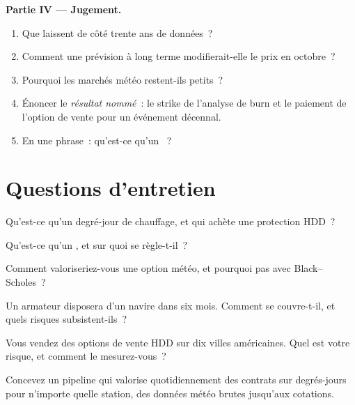 \begin{problem}
\medskip\noindent\textbf{Partie IV --- Jugement.}
\begin{enumerate}[resume]
\item Que laissent de côté trente ans de données~?
\item Comment une prévision à long terme modifierait-elle le prix en octobre~?
\item Pourquoi les marchés météo restent-ils petits~?
\item Énoncer le \emph{résultat nommé}~: le strike de l'analyse de burn et le paiement de l'option de vente pour un événement décennal.
\item En une phrase~: qu'est-ce qu'un ~?
\end{enumerate}
\end{problem}

\section{Questions d'entretien}

\begin{interviewq}\label{iq:m3:freight-weather-and-other-corners:1}
Qu'est-ce qu'un degré-jour de chauffage, et qui achète une protection HDD~?
\end{interviewq}

\begin{interviewq}\label{iq:m3:freight-weather-and-other-corners:2}
Qu'est-ce qu'un , et sur quoi se règle-t-il~?
\end{interviewq}

\begin{interviewq}\label{iq:m3:freight-weather-and-other-corners:3}
Comment valoriseriez-vous une option météo, et pourquoi pas avec Black--Scholes~?
\end{interviewq}

\begin{interviewq}\label{iq:m3:freight-weather-and-other-corners:4}
Un armateur disposera d'un navire dans six mois. Comment se couvre-t-il, et quels risques subsistent-ils~?
\end{interviewq}

\begin{interviewq}\label{iq:m3:freight-weather-and-other-corners:5}
Vous vendez des options de vente HDD sur dix villes américaines. Quel est votre risque, et comment le mesurez-vous~?
\end{interviewq}

\begin{interviewq}\label{iq:m3:freight-weather-and-other-corners:6}
Concevez un pipeline qui valorise quotidiennement des contrats sur degrés-jours pour n'importe quelle station, des données météo brutes jusqu'aux cotations.
\end{interviewq}
